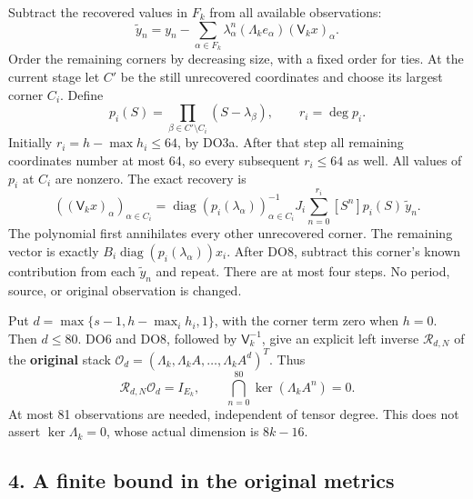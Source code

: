 \documentclass[11pt]{article}
\begin{document}
Subtract the recovered values in \(F_k\) from all available observations: \[
\widetilde y_n=y_n-\sum_{\alpha\in F_k}
\lambda_\alpha^n(\Lambda_k e_\alpha)(\mathsf V_kx)_\alpha.
\] Order the remaining corners by decreasing size, with a fixed order for ties. At the current stage let \(C'\) be the still unrecovered coordinates and choose its largest corner \(C_i\). Define \[
p_i(S)=\prod_{\beta\in C'\setminus C_i}(S-\lambda_\beta),\qquad
r_i=\deg p_i.
\] Initially \(r_i=h-\max h_i\le64\), by DO3a. After that step all remaining coordinates number at most 64, so every subsequent \(r_i\le64\) as well. All values of \(p_i\) at \(C_i\) are nonzero. The exact recovery is \[
\boxed{\displaystyle
((\mathsf V_kx)_\alpha)_{\alpha\in C_i}
=\operatorname{diag}(p_i(\lambda_\alpha))_{\alpha\in C_i}^{-1}
J_i\sum_{n=0}^{r_i}[S^n]p_i(S)\,\widetilde y_n.}
\tag{DO8}
\] The polynomial first annihilates every other unrecovered corner. The remaining vector is exactly \(B_i\operatorname{diag}(p_i(\lambda_\alpha))x_i\). After DO8, subtract this corner's known contribution from each \(\widetilde y_n\) and repeat. There are at most four steps. No period, source, or original observation is changed.

Put \(d=\max\{s-1,h-\max_i h_i,1\}\), with the corner term zero when \(h=0\). Then \(d\le80\). DO6 and DO8, followed by \(\mathsf V_k^{-1}\), give an explicit left inverse \(\mathcal R_{d,N}\) of the \textbf{original} stack \(\mathcal O_d=(\Lambda_k,\Lambda_k A,\ldots,\Lambda_k A^d)^T\). Thus \[
\boxed{\displaystyle
\mathcal R_{d,N}\mathcal O_d=I_{E_k},\qquad
\bigcap_{n=0}^{80}\ker(\Lambda_k A^n)=0.}
\tag{DO9}
\] At most 81 observations are needed, independent of tensor degree. This does not assert \(\ker\Lambda_k=0\), whose actual dimension is \(8k-16\).

\subsection{4. A finite bound in the original metrics}\label{pdepth:a-finite-bound-in-the-original-metrics}
\end{document}
